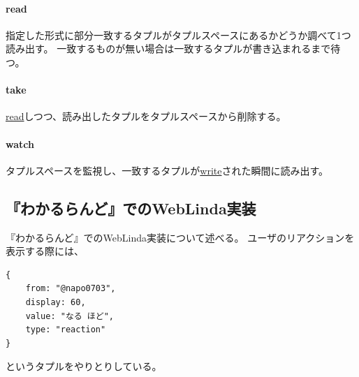 \vspace{2mm}
\paragraph*{read}
指定した形式に部分一致するタプルがタプルスペースにあるかどうか調べて1つ読み出す。
一致するものが無い場合は一致するタプルが書き込まれるまで待つ。

\vspace{2mm}
\paragraph*{take}
\url{read}しつつ、読み出したタプルをタプルスペースから削除する。

\vspace{2mm}
\paragraph*{watch}
タプルスペースを監視し、一致するタプルが\url{write}された瞬間に読み出す。

\subsection{『わかるらんど』でのWebLinda実装}
『わかるらんど』でのWebLinda実装について述べる。
ユーザのリアクションを表示する際には、
\begin{verbatim}
{
    from: "@napo0703",
    display: 60,
    value: "なる ほど",
    type: "reaction"
}
\end{verbatim}
というタプルをやりとりしている。
